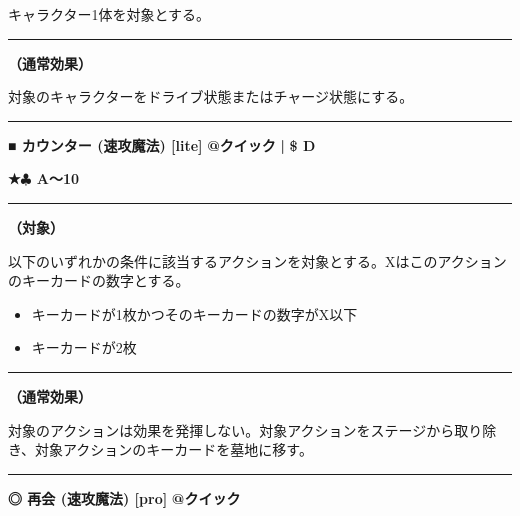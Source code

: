 \documentclass[twocolumn,a5paper,papersize,10pt]{jarticle}
\begin{document}
キャラクター1体を対象とする。
\vspace{1mm}%
\hrule height 0.1mm depth 0mm width 66.5mm %
\vspace{1mm}%

{\bf（通常効果）}

対象のキャラクターをドライブ状態またはチャージ状態にする。
\vspace{2mm} %
\hrule height 0.5mm depth 0mm width 66.5mm %
\vspace{1mm} %
{\small\bf ■ カウンター {\scriptsize (速攻魔法) [lite]}} %
\hfill 
{\footnotesize\bf @クイック }
  {\footnotesize\bf | } {\footnotesize\bf \$ D}

{\footnotesize\bf ★{\normalsize $\clubsuit$} A〜10}

\vspace{1mm}%
\hrule height 0.1mm depth 0mm width 66.5mm %
\vspace{1mm}%
{\bf（対象）}

以下のいずれかの条件に該当するアクションを対象とする。Xはこのアクションのキーカードの数字とする。


\vspace{-1zh}%
\begin{itemize}
\setlength{\leftskip}{-0.3cm}
\setlength{\parskip}{0pt} %

\item キーカードが1枚かつそのキーカードの数字がX以下

\item キーカードが2枚
\vspace{-1zh}%
\end{itemize}
\vspace{1mm}%
\hrule height 0.1mm depth 0mm width 66.5mm %
\vspace{1mm}%

{\bf（通常効果）}

対象のアクションは効果を発揮しない。対象アクションをステージから取り除き、対象アクションのキーカードを墓地に移す。
\vspace{2mm} %
\hrule height 0.5mm depth 0mm width 66.5mm %
\vspace{1mm} %
{\small\bf ◎ 再会 {\scriptsize (速攻魔法) [pro]}} %
\hfill 
{\footnotesize\bf @クイック }
\end{document}
